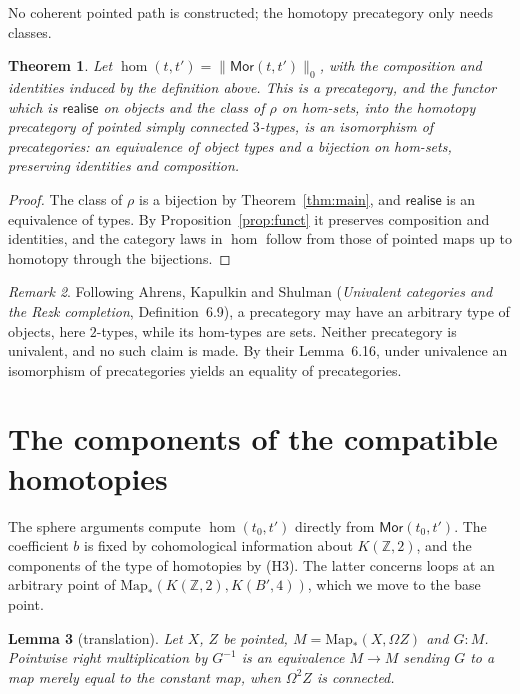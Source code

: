 \documentclass[11pt]{amsart}
\newtheorem{theorem}{Theorem}
\newtheorem{lemma}[theorem]{Lemma}
\theoremstyle{definition}
\theoremstyle{remark}
\newtheorem{remark}[theorem]{Remark}
\newcommand{\Om}{\Omega}
\newcommand{\Mor}{\mathsf{Mor}}
\newcommand{\Map}{\mathrm{Map}_*}
\newcommand{\real}{\mathsf{realise}}
\newcommand{\rmap}{\rho}
\newcommand{\Z}{\mathbb{Z}}
\begin{document}
\noindent No coherent pointed path is constructed; the homotopy precategory only
needs classes.

\begin{theorem}\label{thm:hocat}
Let $\hom(t,t')=\|\Mor(t,t')\|_0$, with the composition and identities induced
by the definition above. This is a precategory, and the functor which is
$\real$ on objects and the class of $\rmap$ on hom-sets, into the homotopy
precategory of pointed simply connected $3$-types, is an \emph{isomorphism of
precategories}: an equivalence of object types and a bijection on hom-sets,
preserving identities and composition.
\end{theorem}
\begin{proof}
The class of $\rmap$ is a bijection by Theorem~\ref{thm:main}, and $\real$ is an
equivalence of types. By Proposition~\ref{prop:funct} it preserves composition
and identities, and the category laws in $\hom$ follow from those of pointed
maps up to homotopy through the bijections.
\end{proof}

\begin{remark}
Following Ahrens, Kapulkin and Shulman (\emph{Univalent categories and the Rezk
completion}, Definition~6.9), a precategory may have an arbitrary type of
objects, here $2$-types, while its hom-types are sets. Neither precategory is
univalent, and no such claim is made. By their Lemma~6.16, under univalence an
isomorphism of precategories yields an equality of precategories.
\end{remark}

\section{The components of the compatible homotopies}\label{sec:comp}

The sphere arguments compute $\hom(t_0,t')$ directly from $\Mor(t_0,t')$. The
coefficient $b$ is fixed by cohomological information about $K(\Z,2)$, and the
components of the type of homotopies by (H3). The latter concerns loops at an
arbitrary point of $\Map(K(\Z,2),K(B',4))$, which we move to the base point.

\begin{lemma}[translation]\label{lem:translation}
Let $X$, $Z$ be pointed, $M=\Map(X,\Om Z)$ and $G:M$. Pointwise right
multiplication by $G^{-1}$ is an equivalence $M\to M$ sending $G$ to a map merely
equal to the constant map, when $\Om^2Z$ is connected.
\end{lemma}
\end{document}
